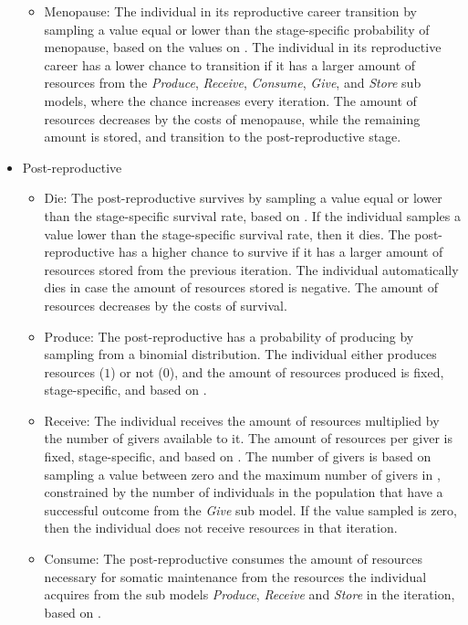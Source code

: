 \documentclass{article}
\begin{document}
\begin{itemize}
\begin{itemize}
        \item Menopause: The individual in its reproductive career transition by sampling a value equal or lower than the stage-specific probability of menopause, based on the values on \citep{laisk2019demographic}. The individual in its reproductive career has a lower chance to transition if it has a larger amount of resources from the \emph{Produce}, \emph{Receive}, \emph{Consume}, \emph{Give}, and \emph{Store} sub models, where the chance increases every iteration. The amount of resources decreases by the costs of menopause, while the remaining amount is stored, and transition to the post-reproductive stage.
    \end{itemize}
    \item Post-reproductive
    \begin{itemize}
        \item Die: The post-reproductive survives by sampling a value equal or lower than the stage-specific survival rate, based on \cite{gurven2007longevity}. If the individual samples a value lower than the stage-specific survival rate, then it dies. The post-reproductive has a higher chance to survive if it has a larger amount of resources stored from the previous iteration. The individual automatically dies in case the amount of resources stored is negative. The amount of resources decreases by the costs of survival.
        \item Produce: The post-reproductive has a probability of producing by sampling from a binomial distribution. The individual either produces resources ($1$) or not ($0$), and the amount of resources produced is fixed, stage-specific, and based on \cite{koster2020life}.
        \item Receive: The individual receives the amount of resources multiplied by the number of givers available to it. The amount of resources per giver is fixed, stage-specific, and based on \cite{gurven2004give}. The number of givers is based on sampling a value between zero and the maximum number of givers in \cite{gurven2004give}, constrained by the number of individuals in the population that have a successful outcome from the \emph{Give} sub model. If the value sampled is zero, then the individual does not receive resources in that iteration.
        \item Consume: The post-reproductive consumes the amount of resources necessary for somatic maintenance from the resources the individual acquires from the sub models \emph{Produce}, \emph{Receive} and \emph{Store} in the iteration, based on \cite{kaplan2000theory, pontzer2021daily}.

\end{itemize}
\end{itemize}
\end{document}
